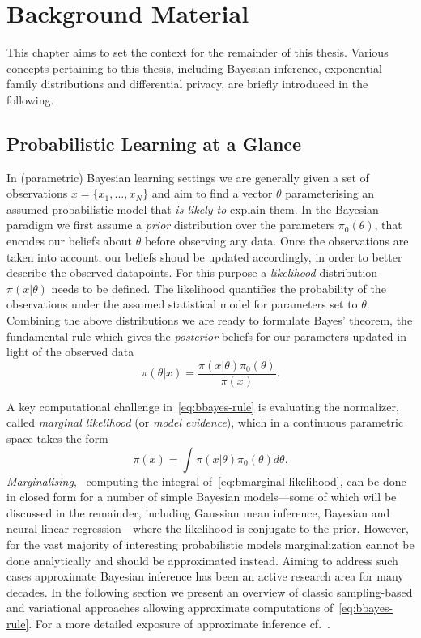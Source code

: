 \chapter{Background Material}
\label{chap:chap2}

This chapter aims to set the context for the remainder of this thesis. Various concepts pertaining to this thesis, including Bayesian inference, exponential family distributions and differential privacy, are briefly introduced in the following.

\section{Probabilistic Learning at  a Glance}
\label{sec:b-bayesian-inference}

In (parametric) Bayesian learning settings we are generally given a set of observations $x = \{x_1,...,x_N\}$ and aim to find a vector $\theta $ parameterising an assumed probabilistic model that \emph{is likely to} explain them. In the Bayesian paradigm we first assume a \emph{prior} distribution over the parameters $\pi_0(\theta)$, that encodes our beliefs about $\theta$ before observing any data. Once the observations are taken into account, our beliefs shoud be updated accordingly, in order to better describe the observed datapoints. For this purpose a \emph{likelihood} distribution $\pi(x|\theta)$ needs to be defined. The likelihood quantifies the probability of the observations under the assumed statistical model for parameters set to $\theta$. Combining the above distributions we are ready to formulate Bayes' theorem, the fundamental rule which gives the \emph{posterior} beliefs for our parameters updated in light of the observed data
\[
\pi(\theta|x) = \frac{\pi(x|\theta)\pi_0(\theta)}{\pi(x)}.
\label{eq:bbayes-rule}
\] 

A key computational challenge in~\cref{eq:bbayes-rule} is evaluating the normalizer, called \emph{marginal likelihood} (or \emph{model evidence}), which in a continuous parametric space takes the form
\[
\pi(x) = \int \pi(x|\theta) \pi_0(\theta) d\theta.
\label{eq:bmarginal-likelihood}
\]
\emph{Marginalising}, \ie~computing the integral of~\cref{eq:bmarginal-likelihood}, can be done in closed form for a number of simple Bayesian models---some of which will be discussed in the remainder, including Gaussian mean inference, Bayesian and neural linear regression---where the likelihood is conjugate to the prior. However, for the vast majority of interesting probabilistic models marginalization cannot be done analytically and should be approximated instead. Aiming to address such cases approximate Bayesian inference has been an active research area for many decades. In the following section we present an overview of classic sampling-based and variational approaches allowing approximate computations of~\cref{eq:bbayes-rule}. For a more detailed exposure of approximate inference cf.~\citep{bishop06,murphy12,angelino16}.

